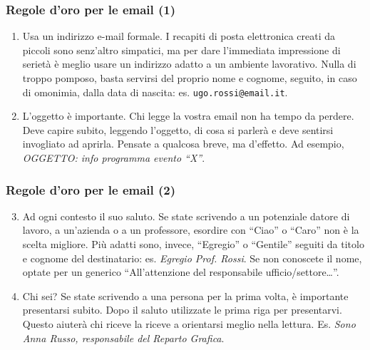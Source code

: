 \documentclass[handout]{beamer}
\begin{document}
\begin{frame}
\frametitle{Regole d'oro per le email (1)}
\begin{enumerate}
  \item \alert{Usa un indirizzo e-mail formale.} I recapiti di posta elettronica creati da piccoli sono senz'altro simpatici, ma per dare l’immediata impressione di serietà è meglio usare un indirizzo adatto a un ambiente lavorativo. Nulla di troppo pomposo, basta servirsi del proprio nome e cognome, seguito, in caso di omonimia, dalla data di nascita: es. \texttt{ugo.rossi@email.it}.\pause
  \item \alert{L’oggetto è importante.} Chi legge la vostra email non ha tempo da perdere. Deve capire subito, leggendo l’oggetto, di cosa si parlerà e deve sentirsi invogliato ad aprirla. Pensate a qualcosa breve, ma d’effetto. Ad esempio, \emph{OGGETTO: info programma evento ``X''}.
\end{enumerate}
\end{frame}



\begin{frame}
\frametitle{Regole d'oro per le email (2)}
\begin{enumerate}\setcounter{enumi}{2}
  \item \alert{Ad ogni contesto il suo saluto.} Se state scrivendo a un potenziale datore di lavoro, a un’azienda o a un professore, esordire con ``Ciao'' o ``Caro'' non è la scelta migliore. Più adatti sono, invece, ``Egregio'' o ``Gentile'' seguiti da titolo e cognome del destinatario: es. \emph{Egregio Prof. Rossi}. Se non conoscete il nome, optate per un generico ``All’attenzione del responsabile ufficio/settore\ldots''.\pause
  \item \alert{Chi sei?} Se state scrivendo a una persona per la prima volta, è importante presentarsi subito. Dopo il saluto utilizzate le prima riga per presentarvi. Questo aiuterà chi riceve la riceve a orientarsi meglio nella lettura. Es. \emph{Sono Anna Russo, responsabile del Reparto Grafica}.
\end{enumerate}
\end{frame}
\end{document}
